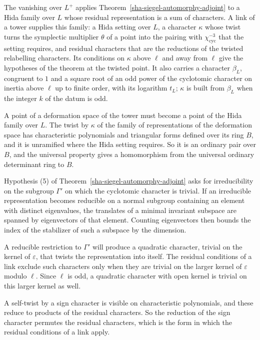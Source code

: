 The vanishing over $L^+$ applies Theorem~\ref{sha-siegel-automorphy-adjoint} to a Hida family over $L$ whose residual representation is a sum of characters. A link of a tower supplies this family: a Hida setting over $L$, a character $\kappa$ whose twist turns the symplectic multiplier $\theta$ of a point into the pairing with $\chi_{\mathrm{cyc}}^{-3}$ that the setting requires, and residual characters that are the reductions of the twisted relabelling characters. Its conditions on $\kappa$ above $\ell$ and away from $\ell$ give the hypotheses of the theorem at the twisted point. It also carries a character $\beta_L$, congruent to $1$ and a square root of an odd power of the cyclotomic character on inertia above $\ell$ up to finite order, with its logarithm $t_L$; $\kappa$ is built from $\beta_L$ when the integer $k$ of the datum is odd.

A point of a deformation space of the tower must become a point of the Hida family over $L$. The twist by $\kappa$ of the family of representations of the deformation space has characteristic polynomials and triangular forms defined over its ring $B$, and it is unramified where the Hida setting requires. So it is an ordinary pair over $B$, and the universal property gives a homomorphism from the universal ordinary determinant ring to $B$.

Hypothesis (5) of Theorem~\ref{sha-siegel-automorphy-adjoint} asks for irreducibility on the subgroup $\Gamma'$ on which the cyclotomic character is trivial. If an irreducible representation becomes reducible on a normal subgroup containing an element with distinct eigenvalues, the translates of a minimal invariant subspace are spanned by eigenvectors of that element. Counting eigenvectors then bounds the index of the stabilizer of such a subspace by the dimension.

A reducible restriction to $\Gamma'$ will produce a quadratic character, trivial on the kernel of $\varepsilon$, that twists the representation into itself. The residual conditions of a link exclude such characters only when they are trivial on the larger kernel of $\varepsilon$ modulo $\ell$. Since $\ell$ is odd, a quadratic character with open kernel is trivial on this larger kernel as well.

A self-twist by a sign character is visible on characteristic polynomials, and these reduce to products of the residual characters. So the reduction of the sign character permutes the residual characters, which is the form in which the residual conditions of a link apply.

